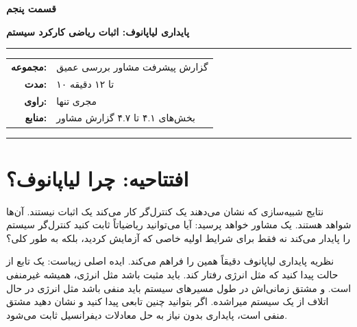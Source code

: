 \documentclass[12pt, a4paper]{article}
\newcommand{\dash}{\lr{---}}
\begin{document}

\thispagestyle{empty}

\vspace*{1.2cm}

{\centering
{\color{seriesblue}\fontsize{24}{30}\selectfont\bfseries قسمت پنجم}

\vspace{0.5cm}
{\fontsize{15}{20}\selectfont\bfseries پايداری لياپانوف: اثبات رياضی کارکرد سيستم}

\vspace{0.9cm}
{\color{seriesblue}\rule{0.55\linewidth}{1pt}}
\vspace{0.7cm}

{\normalsize
\begin{tabular}{rl}
  \textbf{مجموعه:}     & گزارش پيشرفت مشاور \dash{} بررسی عمیق \\[5pt]
  \textbf{مدت:}        & ۱۰ تا ۱۲ دقیقه \\[5pt]
  \textbf{راوی:}       & مجری تنها \\[5pt]
  \textbf{منابع:}      & بخش‌های ۴.۱ تا ۴.۷ گزارش مشاور \\
\end{tabular}
}

\vspace{0.9cm}
{\color{seriesblue}\rule{0.55\linewidth}{0.4pt}}
\par}

\vspace{1.2cm}

\section{افتتاحیه: چرا لياپانوف؟}

نتايج شبيه‌سازی که نشان می‌دهند يک کنترل‌گر کار می‌کند يک اثبات نيستند. آن‌ها شواهد هستند. يک مشاور خواهد پرسيد: آيا می‌توانيد رياضياتاً ثابت کنيد کنترل‌گر سيستم را پايدار می‌کند \dash{} نه فقط برای شرايط اوليه خاصی که آزمايش کرديد، بلکه به طور کلی؟

نظريه پايداری لياپانوف دقيقاً همين را فراهم می‌کند. ايده اصلی زيباست: يک تابع  از حالت پيدا کنيد که مثل انرژی رفتار کند. بايد مثبت باشد \dash{} مثل انرژی، هميشه غيرمنفی است. و مشتق زمانی‌اش در طول مسيرهای سيستم بايد منفی باشد \dash{} مثل انرژی در حال اتلاف از يک سيستم ميراشده. اگر بتوانيد چنين تابعی پيدا کنيد و نشان دهيد مشتق منفی است، پايداری بدون نياز به حل معادلات ديفرانسيل ثابت می‌شود.
\end{document}
